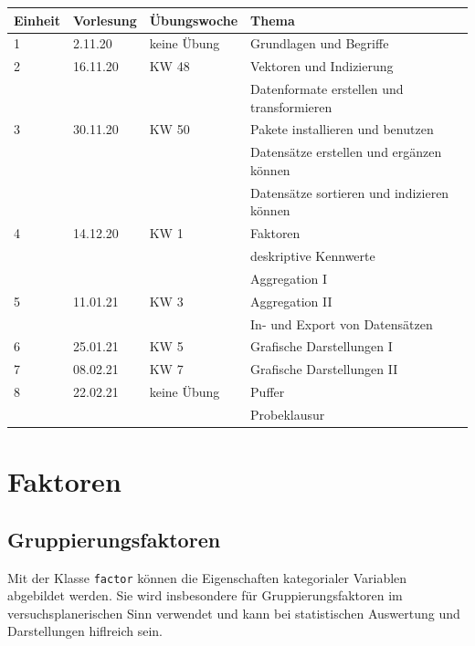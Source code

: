\documentclass[
]{book}
\begin{document}
\begin{table}[H]
\centering\begingroup\fontsize{15}{17}\selectfont

\begin{tabular}{l|l|l|l}
\hline
Einheit & Vorlesung & Übungswoche & Thema\\
\hline
1 & 2.11.20 & keine Übung & Grundlagen und Begriffe\\
\hline
2 & 16.11.20 & KW 48 & Vektoren und Indizierung\\
\hline
 &  &  & Datenformate erstellen und transformieren\\
\hline
3 & 30.11.20 & KW 50 & Pakete installieren und benutzen\\
\hline
 &  &  & Datensätze erstellen und ergänzen können\\
\hline
 &  &  & Datensätze sortieren und indizieren können\\
\hline
4 & 14.12.20 & KW 1 & Faktoren\\
\hline
 &  &  & deskriptive Kennwerte\\
\hline
 &  &  & Aggregation I\\
\hline
5 & 11.01.21 & KW 3 & Aggregation II\\
\hline
 &  &  & In- und Export von Datensätzen\\
\hline
6 & 25.01.21 & KW 5 & Grafische Darstellungen I\\
\hline
7 & 08.02.21 & KW 7 & Grafische Darstellungen II\\
\hline
8 & 22.02.21 & keine Übung & Puffer\\
\hline
 &  &  & Probeklausur\\
\hline
\end{tabular}
\endgroup{}
\end{table}

\hypertarget{faktoren}{%
\section{Faktoren}\label{faktoren}}

\hypertarget{gruppierungsfaktoren}{%
\subsection{Gruppierungsfaktoren}\label{gruppierungsfaktoren}}

Mit der Klasse \texttt{factor} können die Eigenschaften kategorialer Variablen abgebildet werden. Sie wird insbesondere für Gruppierungsfaktoren im versuchsplanerischen Sinn verwendet und kann bei statistischen Auswertung und Darstellungen hiflreich sein.
\end{document}
